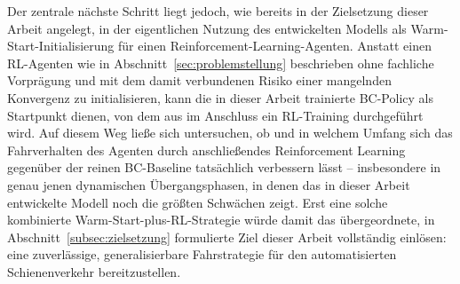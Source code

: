 Der zentrale nächste Schritt liegt jedoch, wie bereits in der Zielsetzung dieser Arbeit angelegt, in der eigentlichen Nutzung des entwickelten Modells als Warm-Start-Initialisierung für einen Reinforcement-Learning-Agenten. Anstatt einen RL-Agenten wie in Abschnitt~\ref{sec:problemstellung} beschrieben ohne fachliche Vorprägung und mit dem damit verbundenen Risiko einer mangelnden Konvergenz zu initialisieren, kann die in dieser Arbeit trainierte BC-Policy als Startpunkt dienen, von dem aus im Anschluss ein RL-Training durchgeführt wird. Auf diesem Weg ließe sich untersuchen, ob und in welchem Umfang sich das Fahrverhalten des Agenten durch anschließendes Reinforcement Learning gegenüber der reinen BC-Baseline tatsächlich verbessern lässt – insbesondere in genau jenen dynamischen Übergangsphasen, in denen das in dieser Arbeit entwickelte Modell noch die größten Schwächen zeigt. Erst eine solche kombinierte Warm-Start-plus-RL-Strategie würde damit das übergeordnete, in Abschnitt~\ref{subsec:zielsetzung} formulierte Ziel dieser Arbeit vollständig einlösen: eine zuverlässige, generalisierbare Fahrstrategie für den automatisierten Schienenverkehr bereitzustellen.
